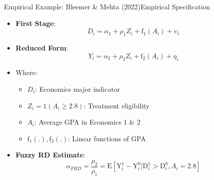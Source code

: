 \documentclass[hyperref={pdfpagelabels=false}]{beamer}
\begin{document}
\begin{frame}{Empirical Example: Bleemer \& Mehta (2022)}{Empirical Specification}
	\begin{itemize}
		\item \textbf{First Stage}:
		\begin{equation*}
			D_i = \alpha_1 + \rho_1 Z_i + \mathrm{f}_1(A_i) + \upsilon_i
		\end{equation*}
		
		\item \textbf{Reduced Form}:
		\begin{equation*}
			Y_i = \alpha_2 + \rho_2 Z_i + \mathrm{f}_2(A_i) + \eta_i
		\end{equation*}
		
		\item Where:
		\begin{itemize}
			\item $D_i$: Economics major indicator
			\item $Z_i = 1(A_i \geq 2.8)$: Treatment eligibility
			\item $A_i$: Average GPA in Economics 1 \& 2
			\item $\mathrm{f}_1(.), \mathrm{f}_2(.)$: Linear functions of GPA
		\end{itemize}
		
		\vspace{0.2cm}
		\item \textbf{Fuzzy RD Estimate}:
		\begin{equation*}
			\alpha_{FRD} = \frac{\rho_2}{\rho_1} = \mathrm{E}[ \mathrm{Y}^1_i - \mathrm{Y}^0_i | \mathrm{D}^1_i > \mathrm{D}^0_i, A_i=2.8]
		\end{equation*}
	\end{itemize}
\end{frame}
\end{document}
